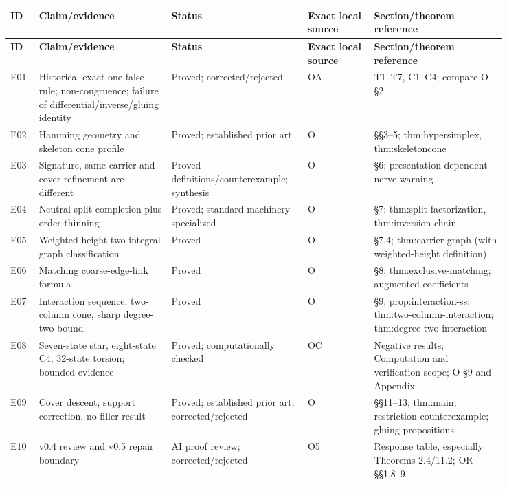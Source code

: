 \documentclass[10pt,letterpaper]{article}
\begin{document}
\begingroup
\scriptsize
\setlength{\tabcolsep}{4pt}
\renewcommand{\arraystretch}{1.12}
\begin{longtable}{@{}P{0.050\linewidth}P{0.246\linewidth}P{0.180\linewidth}P{0.123\linewidth}P{0.245\linewidth}@{}}
\hline
\textbf{ID} & \textbf{Claim/evidence} & \textbf{Status} & \textbf{Exact local source} & \textbf{Section/theorem reference} \\ \hline
\endfirsthead
\hline
\textbf{ID} & \textbf{Claim/evidence} & \textbf{Status} & \textbf{Exact local source} & \textbf{Section/theorem reference} \\ \hline
\endhead
E01 & Historical exact-one-false rule; non-congruence; failure of differential/inverse/gluing identity & Proved; corrected/rejected & OA & T1--T7, C1--C4; compare O \S{}2 \\ \hline
E02 & Hamming geometry and skeleton cone profile & Proved; established prior art & O & \S{}\S{}3--5; thm:hypersimplex, thm:skeletoncone \\ \hline
E03 & Signature, same-carrier and cover refinement are different & Proved definitions/counterexample; synthesis & O & \S{}6; presentation-dependent nerve warning \\ \hline
E04 & Neutral split completion plus order thinning & Proved; standard machinery specialized & O & \S{}7; thm:split-factorization, thm:inversion-chain \\ \hline
E05 & Weighted-height-two integral graph classification & Proved & O & \S{}7.4; thm:carrier-graph (with weighted-height definition) \\ \hline
E06 & Matching coarse-edge-link formula & Proved & O & \S{}8; thm:exclusive-matching; augmented coefficients \\ \hline
E07 & Interaction sequence, two-column cone, sharp degree-two bound & Proved & O & \S{}9; prop:interaction-ss; thm:two-column-interaction; thm:degree-two-interaction \\ \hline
E08 & Seven-state star, eight-state C4, 32-state torsion; bounded evidence & Proved; computationally checked & OC & Negative results; Computation and verification scope; O \S{}9 and Appendix \\ \hline
E09 & Cover descent, support correction, no-filler result & Proved; established prior art; corrected/rejected & O & \S{}\S{}11--13; thm:main; restriction counterexample; gluing propositions \\ \hline
E10 & v0.4 review and v0.5 repair boundary & AI proof review; corrected/rejected & O5 & Response table, especially Theorems 2.4/11.2; OR \S{}\S{}1,8--9 \\ \hline

\end{longtable}
\end{document}

